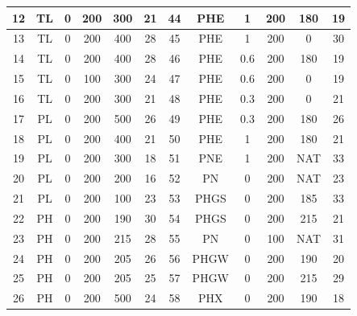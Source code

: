 \begin{table}[p]
\begin{center}
\begin{tabular}{|c|c|c|c|c|c||c|c|c|c|c|c|}
12   & TL      & 0     & 200        & 300       & 21          &   44   & PHE     & 1     & 200        & 180       & 19          \\ \hline
13   & TL      & 0     & 200        & 400       & 28          &   45   & PHE     & 1     & 200        & 0         & 30          \\ \hline
14   & TL      & 0     & 200        & 400       & 28          &   46   & PHE     & 0.6   & 200        & 180       & 19          \\ \hline
15   & TL      & 0     & 100        & 300       & 24          &   47   & PHE     & 0.6   & 200        & 0         & 19          \\ \hline
16   & TL      & 0     & 200        & 300       & 21          &   48   & PHE     & 0.3   & 200        & 0         & 21          \\ \hline
17   & PL      & 0     & 200        & 500       & 26          &   49   & PHE     & 0.3   & 200        & 180       & 26          \\ \hline
18   & PL      & 0     & 200        & 400       & 21          &   50   & PHE     & 1     & 200        & 180       & 21          \\ \hline
19   & PL      & 0     & 200        & 300       & 18          &   51   & PNE     & 1     & 200        & NAT       & 33          \\ \hline
20   & PL      & 0     & 200        & 200       & 16          &   52   & PN      & 0     & 200        & NAT       & 23          \\ \hline
21   & PL      & 0     & 200        & 100       & 23          &   53   & PHGS    & 0     & 200        & 185       & 33          \\ \hline
22   & PH      & 0     & 200        & 190       & 30          &   54   & PHGS    & 0     & 200        & 215       & 21          \\ \hline
23   & PH      & 0     & 200        & 215       & 28          &   55   & PN      & 0     & 100        & NAT       & 31          \\ \hline
24   & PH      & 0     & 200        & 205       & 26          &   56   & PHGW    & 0     & 200        & 190       & 20          \\ \hline
25   & PH      & 0     & 200        & 205       & 25          &   57   & PHGW    & 0     & 200        & 215       & 29          \\ \hline
26   & PH      & 0     & 200        & 500       & 24          &   58   & PHX     & 0     & 200        & 190       & 18          \\ \hline

\end{tabular}
\end{center}
\end{table}
